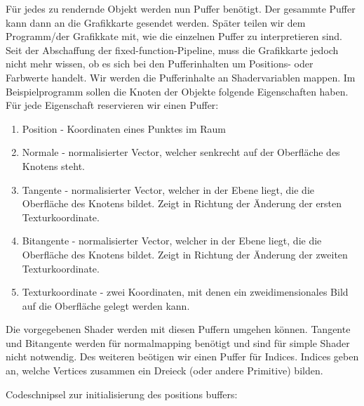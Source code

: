 \documentclass[a4paper,12pt]{article}
\begin{document}
Für jedes zu rendernde Objekt werden nun Puffer benötigt. Der gesammte Puffer kann dann an die Grafikkarte gesendet werden. Später teilen wir dem Programm/der Grafikkate mit, wie die einzelnen Puffer zu interpretieren sind. Seit der Abschaffung der fixed-function-Pipeline, muss die Grafikkarte jedoch nicht mehr wissen, ob es sich bei den Pufferinhalten um Positions- oder Farbwerte handelt. Wir werden die Pufferinhalte an Shadervariablen mappen.
Im Beispielprogramm sollen die Knoten der Objekte folgende Eigenschaften haben. Für jede Eigenschaft reservieren wir einen Puffer:
\begin{enumerate}
\item
Position - Koordinaten eines Punktes im Raum
\item
Normale - normalisierter Vector, welcher senkrecht auf der Oberfläche des Knotens steht.
\item
Tangente - normalisierter Vector, welcher in der Ebene liegt, die die Oberfläche des Knotens bildet. Zeigt in Richtung der Änderung der ersten Texturkoordinate.
\item
Bitangente - normalisierter Vector, welcher in der Ebene liegt, die die Oberfläche des Knotens bildet. Zeigt in Richtung der Änderung der zweiten Texturkoordinate.
\item
Texturkoordinate - zwei Koordinaten, mit denen ein zweidimensionales Bild auf die Oberfläche gelegt werden kann.
\end{enumerate}
Die vorgegebenen Shader werden mit diesen Puffern umgehen können. Tangente und Bitangente werden für normalmapping benötigt und sind für simple Shader nicht notwendig.
Des weiteren beötigen wir einen Puffer für Indices. Indices geben an, welche Vertices zusammen ein Dreieck (oder andere Primitive) bilden.

Codeschnipsel zur initialisierung des positions buffers:
\end{document}
